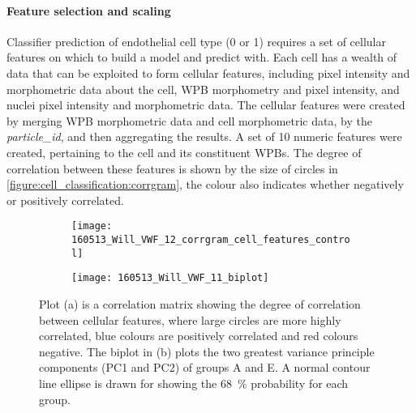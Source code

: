 \paragraph{Feature selection and scaling}
Classifier prediction of endothelial cell type (0 or 1) requires a set of cellular features on which to build a model and predict with. Each cell has a wealth of data that can be exploited to form cellular features, including pixel intensity and morphometric data about the cell, WPB morphometry and pixel intensity, and nuclei pixel intensity and morphometric data. The cellular features were created by merging WPB morphometric data and cell morphometric data, by the \emph{particle\_id}, and then aggregating the results. A set of 10 numeric features were created, pertaining to the cell and its constituent WPBs. The degree of correlation between these features is shown by the size of circles in \autoref{figure:cell_classification:corrgram}, the colour also indicates whether negatively or positively correlated.

\begin{figure}[!htbp]
	\centering
	\begin{subfigure}[b]{0.73\linewidth}
		\texttt{[image: 160513\_Will\_VWF\_12\_corrgram\_cell\_features\_control]}
		\caption{}
		\label{figure:cell_classification:corrgram}
	\end{subfigure}
	\begin{subfigure}[b]{0.73\linewidth}
		\texttt{[image: 160513\_Will\_VWF\_11\_biplot]}
		\caption{}
		\label{figure:cell_classification:ggbiplot}
	\end{subfigure}
	\caption[Correlation matrix cellular features plot and biplot of PCA]{Plot (a) is a correlation matrix showing the degree of correlation between cellular features, where large circles are more highly correlated, blue colours are positively correlated and red colours negative. The biplot in (b) plots the two greatest variance principle components (PC1 and PC2) of groups A and E. A normal contour line ellipse is drawn for showing the 68~$\%$ probability for each group.}
	\label{figure:cell_classification:feature_selection_and_PCA}
\end{figure}


